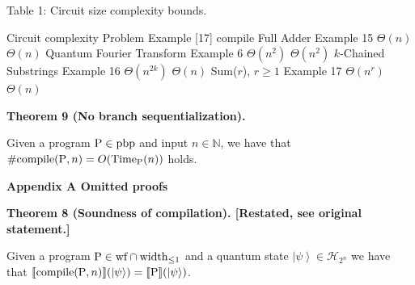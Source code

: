 \documentclass[10pt,a4paper]{amsart}
\begin{document}
 
 
Table 1: Circuit size complexity bounds.\par
     Circuit complexity     Problem   Example     [17]     compile     Full Adder   Example 15     $\Theta(n)$     $\Theta(n)$     Quantum Fourier Transform   Example 6     $\Theta(n^{2})$     $\Theta(n^{2})$      $k$-Chained Substrings   Example 16     $\Theta(n^{2k})$     $\Theta(n)$     Sum($r$), $r\geq 1$    Example 17     $\Theta(n^{r})$     $\Theta(n)$      
 
 

 
\par\medskip\noindent\textbf{Theorem 9 (No branch sequentialization).}\par
 
 
Given a program $\mathrm{P}\in\textnormal{{pbp}}{}$ and input $n\in\mathbb{N}$, we have that $\#\textnormal{{{compile}}{}}(\mathrm{P},n)=O(\textnormal{Time}_{\mathrm{P}}(n))$ holds.\par
 
 

 
\par\medskip\noindent\textbf{Appendix A Omitted proofs}\par
 
 
 
\par\medskip\noindent\textbf{Theorem 8 (Soundness of compilation). [Restated, see original statement.]}\par
 
 
Given a program $\mathrm{P}\in\textnormal{{wf}}\cap\textnormal{{width}}_{\leq 1}$ and a quantum state $\left|\psi\right\rangle\in\mathcal{H}_{2^{n}}$ we have that $\llbracket\textnormal{{compile}}{}(\mathrm{P},n)\rrbracket(\left|\psi\right%
\rangle)=\llbracket\mathrm{P}\rrbracket(\left|\psi\right\rangle)$.\par
 
 
 
\end{document}
